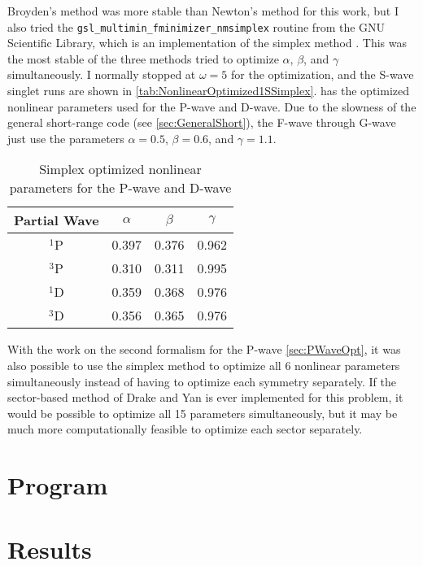 \documentclass[Dissertation.tex]{subfiles}
\begin{document}
Broyden's method was more stable than Newton's method for this work, but I also tried the \texttt{gsl\_multimin\_fminimizer\_nmsimplex} routine from the GNU Scientific Library, which is an implementation of the simplex method \cite{GSL,GSLsimplex}. This was the most stable of the three methods tried to optimize $\alpha$, $\beta$, and $\gamma$ simultaneously. I normally stopped at $\omega = 5$ for the optimization, and the S-wave singlet runs are shown in \cref{tab:NonlinearOptimized1SSimplex}.  has the optimized nonlinear parameters used for the P-wave and D-wave. Due to the slowness of the general short-range code (see \cref{sec:GeneralShort}), the F-wave through G-wave just use the parameters $\alpha = 0.5$, $\beta = 0.6$, and $\gamma = 1.1$.

\begin{table}[H]
\small
\centering
\begin{tabular}{c c c c}
\toprule
Partial Wave & $\alpha$ & $\beta$ & $\gamma$ \\
\midrule
$^1$P & 0.397 & 0.376 & 0.962 \\
$^3$P & 0.310 & 0.311 & 0.995 \\
$^1$D & 0.359 & 0.368 & 0.976 \\
$^3$D & 0.356 & 0.365 & 0.976 \\
\bottomrule
\end{tabular}
\caption{Simplex optimized nonlinear parameters for the P-wave and D-wave}
\label{tab:NonlinearOptimizedPD}
\end{table}

With the work on the second formalism for the P-wave \cref{sec:PWaveOpt}, it was also possible to use the simplex method to optimize all 6 nonlinear parameters simultaneously instead of having to optimize each symmetry separately. If the sector-based method of Drake and Yan \cite{Yan1995} is ever implemented for this problem, it would be possible to optimize all 15 parameters simultaneously, but it may be much more computationally feasible to optimize each sector separately.


\section{Program}


\section{Results}

\end{document}

